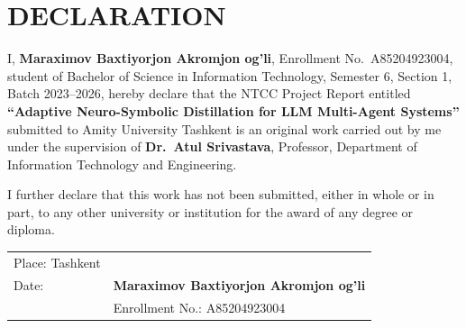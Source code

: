 \chapter*{DECLARATION}

I, \textbf{Maraximov Baxtiyorjon Akromjon og'li}, Enrollment No.\ A85204923004, student of
Bachelor of Science in Information Technology, Semester 6, Section 1, Batch 2023--2026,
hereby declare that the NTCC Project Report entitled \textbf{``Adaptive Neuro-Symbolic
Distillation for LLM Multi-Agent Systems''} submitted to Amity University Tashkent is an
original work carried out by me under the supervision of \textbf{Dr.\ Atul Srivastava},
Professor, Department of Information Technology and Engineering.

I further declare that this work has not been submitted, either in whole or in part, to any
other university or institution for the award of any degree or diploma.

\vspace{3cm}

\noindent
\begin{tabular}{ll}
Place: Tashkent & \hspace{6cm} \\[0.5cm]
Date: \underline{\hspace{3cm}} & \textbf{Maraximov Baxtiyorjon Akromjon og'li} \\
 & Enrollment No.: A85204923004
\end{tabular}

